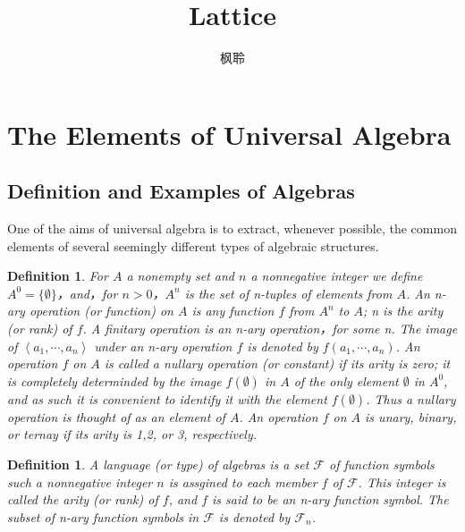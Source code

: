 \documentclass{article}
\newtheorem{definition}[theorem]{Definition}
\begin{document}
\title{Lattice}
\author{枫聆}
\maketitle
\tableofcontents
\newpage
\section{The Elements of Universal Algebra}
\subsection{Definition and Examples of Algebras}
{\color{red}
One of the aims of universal algebra is to extract, whenever possible, the common elements
of several seemingly different types of algebraic structures}.

\begin{definition}
\rm For $A$ a nonempty set and $n$ a nonnegative integer we define $A^{0} = \{\emptyset\}$，and，for $n > 0$，$A^n$ is the set of n-tuples of elements from $A$. An {\color{red} n-ary operation} (or function) on $A$ is any function $f$ from $A^n$ to $A$; n is the {\color{red} arity} (or rank) of $f$. A {\color{red} finitary operation} is an n-ary operation，for some n. The image of $\left< a_1, \cdots , a_n \right>$ under an n-ary operation $f$ is denoted by $f(a_1,\cdots,a_n)$. An operation $f$ on $A$ is called a {\color{red} nullary operation} (or constant) if its arity is zero; it is completely determinded by the image $f(\emptyset)$ in $A$ of the only element $\emptyset$ in $A^0$, and as such it is convenient to identify it with the element $f(\emptyset)$. Thus a nullary operation is thought of as an element of $A$. An operation $f$ on $A$ is {\color{red} unary, binary, or ternay} if its arity is 1,2, or 3, respectively.
\end{definition}


\begin{definition}
\rm A {\color{red} language} (or type) of algebras is a set $\mathcal{F}$ of function symbols such a nonnegative integer $n$ is assgined to each member $f$ of $\mathcal{F}$. This integer is called the arity (or rank) of $f$, and $f$ is said to be an n-ary function symbol. The subset of n-ary function symbols in $\mathcal{F}$ is denoted by $\mathcal{F}_n$.
\end{definition}
\end{document}
